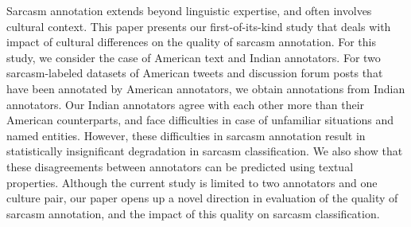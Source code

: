 Sarcasm annotation extends beyond linguistic expertise, and often involves cultural context. This paper presents our first-of-its-kind study that deals with impact of cultural differences on the quality of sarcasm annotation. For this study, we consider the case of American text and Indian annotators. For two sarcasm-labeled datasets of American tweets and discussion forum posts that have been annotated by American annotators, we obtain annotations from Indian annotators. Our Indian annotators agree with each other more than their American counterparts, and face difficulties in case of unfamiliar situations and named entities.  However, these difficulties in sarcasm annotation result in statistically insignificant degradation in sarcasm classification. We also show that these disagreements between annotators can be predicted using textual properties. Although the current study is limited to two annotators and one culture pair, our paper opens up a novel direction in evaluation of the quality of sarcasm annotation, and the impact of this quality on sarcasm classification.
